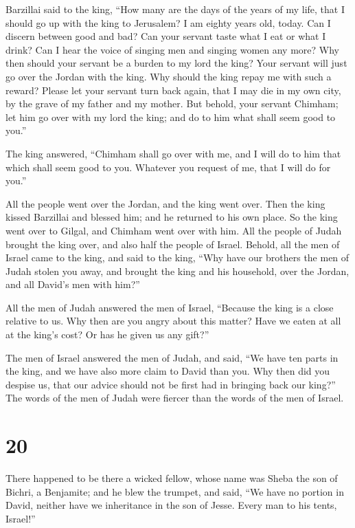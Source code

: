 Barzillai said to the king, ``How many are the days of
the years of my life, that I should go up with the king to Jerusalem?
 I am eighty years old, today. Can I discern between good
and bad? Can your servant taste what I eat or what I drink? Can I hear
the voice of singing men and singing women any more? Why then should
your servant be a burden to my lord the king?  Your
servant will just go over the Jordan with the king. Why should the king
repay me with such a reward?  Please let your servant
turn back again, that I may die in my own city, by the grave of my
father and my mother. But behold, your servant Chimham; let him go over
with my lord the king; and do to him what shall seem good to you.''

 The king answered, ``Chimham shall go over with me, and
I will do to him that which shall seem good to you. Whatever you request
of me, that I will do for you.''

 All the people went over the Jordan, and the king went
over. Then the king kissed Barzillai and blessed him; and he returned to
his own place.  So the king went over to Gilgal, and
Chimham went over with him. All the people of Judah brought the king
over, and also half the people of Israel.  Behold, all
the men of Israel came to the king, and said to the king, ``Why have our
brothers the men of Judah stolen you away, and brought the king and his
household, over the Jordan, and all David's men with him?''

 All the men of Judah answered the men of Israel,
``Because the king is a close relative to us. Why then are you angry
about this matter? Have we eaten at all at the king's cost? Or has he
given us any gift?''

 The men of Israel answered the men of Judah, and said,
``We have ten parts in the king, and we have also more claim to David
than you. Why then did you despise us, that our advice should not be
first had in bringing back our king?'' The words of the men of Judah
were fiercer than the words of the men of Israel.

\hypertarget{section-19}{%
\section{20}\label{section-19}}

 There happened to be there a wicked fellow, whose name
was Sheba the son of Bichri, a Benjamite; and he blew the trumpet, and
said, ``We have no portion in David, neither have we inheritance in the
son of Jesse. Every man to his tents, Israel!''


